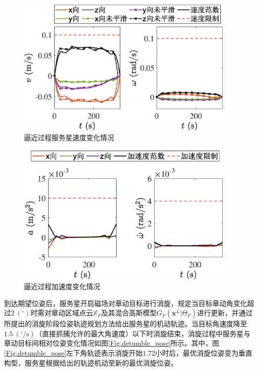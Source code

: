 \documentclass[lang=chs, degree=master, blindreview=false, winfonts=true]{yanputhesis}
\begin{document}
\begin{figure}[htb!]
	\centering
	\includegraphics[width = 4.2in]{picture/proximity_vec_all.eps}
	\caption{逼近过程服务星速度变化情况}
	\label{fig:proximi_vec}
\end{figure}

\begin{figure}[htb!]
	\centering
	\includegraphics[width = 4.2in]{picture/proximity_acc_all.eps}
	\caption{逼近过程加速度变化情况}
	\label{fig:proximi_acc}
\end{figure}

到达期望位姿后，服务星开启磁场对章动目标进行消旋，规定当目标章动角变化超过$2\  (^\circ)$时需对章动区域点云${\mathbb{X}_F}$及其混合高斯模型${G_F}({{\boldsymbol{x}}^{\mathcal{L}}}|{\Theta _F})$进行更新，并通过所提出的消旋阶段位姿轨迹规划方法给出服务星的机动轨迹。当目标角速度降至$1.5\ (\mathrm{^\circ/s})$（直接抓捕允许的最大角速度）以下时消旋结束，消旋过程中服务星与章动目标间相对位姿变化情况如图\ref{Fig.detumble_pose}所示。其中，图\ref{Fig.detumble_pose}左下角轨迹表示消旋开始$1.72$小时后，最优消旋位姿变为垂直构型，服务星根据给出的轨迹机动至新的最优消旋位姿。

\end{document}
